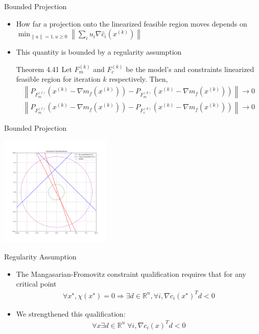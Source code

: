 \documentclass{beamer}
\newcommand{\Rn}{\mathbb R ^ {n}}
\newcommand{\xk}{{{x}^{(k)}}}
\begin{document}
\begin{frame}{Bounded Projection}
	\begin{itemize}
		\item How far a projection onto the linearized feasible region moves depends on
		$
			\min_{\|u\| = 1, u \ge 0} \left\|\sum_{i} u_i \nabla \hat c_i\left(\xk\right)\right\|
		$
		\item This quantity is bounded by a regularity assumption
		\begin{block}{Theorem 4.41}
			Let $F_m^{(k)}$ and $F_c^{(k)}$ be the model's and constraints linearized feasible region for iteration $k$ respectively.
			Then,
			\begin{align*}
				\left\|P_{F_m^{(l)}}\left(\xk - \nabla m_f\left(\xk\right)\right)
				-  P_{F_m^{(k)}}\left(\xk - \nabla m_f\left(\xk\right)\right)\right\| \to 0 \\
				\left\|P_{F_m^{(l)}}\left(\xk - \nabla m_f\left(\xk\right)\right)
				-  P_{F_c^{(k)}}\left(\xk - \nabla m_f\left(\xk\right)\right)\right\| \to 0
			\end{align*}
		\end{block}
	\end{itemize}
\end{frame}



\begin{frame}{Bounded Projection}
	\begin{center}
		\includegraphics[width=200px]{images/classification.png}
	\end{center}
\end{frame}


\begin{frame}{Regularity Assumption}
\begin{itemize}
\item The Mangasarian-Fromovitz constraint qualification requires that for any critical point 
\begin{align*}
\forall x^{\star}, \chi\left(x^{\star}\right) = 0 
\Longrightarrow \exists d \in \Rn, \forall i, \nabla c_i\left(x^{\star}\right)^T d < 0 
\end{align*}
\item We strengthened this qualification:
\begin{align*}
\forall x \exists d \in \Rn\; \forall i, \nabla c_i\left(x\right)^T d < 0
\end{align*}
\end{itemize}
\end{frame}
\end{document}
